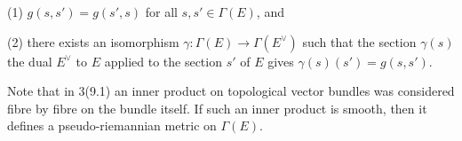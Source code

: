(1) $g(s, s') = g(s', s)$ for all $s, s' \in \Gamma(E)$, and

(2) there exists an isomorphism $\gamma: \Gamma(E) \rightarrow \Gamma(E^\vee)$ such that the section $\gamma(s)$ the dual $E^\vee$ to $E$ applied to the section $s'$ of $E$ gives $\gamma(s)(s') = g(s, s')$.

Note that in 3(9.1) an inner product on topological vector bundles was considered fibre by fibre on the bundle itself. If such an inner product is smooth, then it defines a pseudo-riemannian metric on $\Gamma(E)$.
